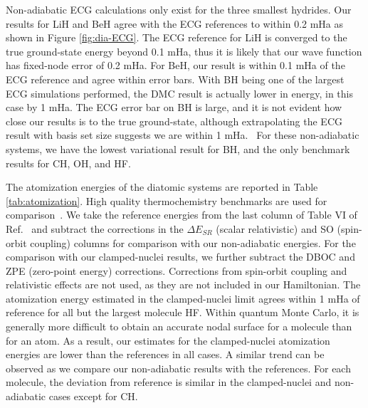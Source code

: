 \documentclass[pra,superscriptaddress,groupedaddress,twocolumn]{revtex4}
\begin{document}
Non-adiabatic ECG calculations only exist for the three smallest hydrides. Our results for LiH and BeH agree with the ECG references to within 0.2 mHa as shown in Figure \ref{fig:dia-ECG}. The ECG reference for LiH is converged to the true ground-state energy beyond 0.1 mHa, thus it is likely that our wave function has fixed-node error of 0.2 mHa. For BeH, our result is within 0.1 mHa of the ECG reference and agree within error bars. With BH being one of the largest ECG simulations performed, the DMC result is actually lower in energy, in this case by 1 mHa. The ECG error bar on BH is large, and it is not evident how close our results is to the true ground-state, although extrapolating the ECG result with basis set size suggests we are within 1 mHa.~\cite{Bubin_BeH_noBO} For these non-adiabatic systems, we have the lowest variational result for BH, and the only benchmark results for CH, OH, and HF.

The atomization energies of the diatomic systems are reported in Table \ref{tab:atomization}. High quality thermochemistry benchmarks are used for comparison~\cite{Feller_Corrections}. We take the reference energies from the last column of Table VI of Ref.~\cite{Feller_Corrections} and subtract the corrections in the $\Delta E_{SR}$ (scalar relativistic) and SO (spin-orbit coupling) columns for comparison with our non-adiabatic energies. For the comparison with our clamped-nuclei results, we further subtract the DBOC and ZPE (zero-point energy) corrections. Corrections from spin-orbit coupling and relativistic effects are not used, as they are not included in our Hamiltonian. The atomization energy estimated in the clamped-nuclei limit agrees within 1 mHa of reference for all but the largest molecule HF. %
Within quantum Monte Carlo, it is generally more difficult to obtain an accurate nodal surface for a molecule than for an atom. As a result, our estimates for the clamped-nuclei atomization energies are lower than the references in all cases. A similar trend can be observed as we compare our non-adiabatic results with the references. For each molecule, the deviation from reference is similar in the clamped-nuclei and non-adiabatic cases except for CH.
\end{document}
